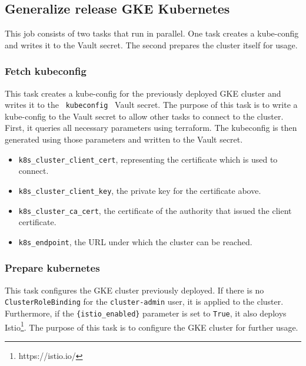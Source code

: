 \subsection{Generalize release GKE Kubernetes}\label{subsec:generalize-release-gke-kubernetes}

This job consists of two tasks that run in parallel.
One task creates a kube-config and writes it to the Vault secret.
The second prepares the cluster itself for usage.

\subsubsection{Fetch kubeconfig}\label{subsubsec:fetch-kubeconfig}

This task creates a kube-config for the previously deployed GKE cluster and writes it to the \verb| kubeconfig | Vault secret.
The purpose of this task is to write a kube-config to the Vault secret to allow other tasks to connect to the cluster.
First, it queries all necessary parameters using terraform.
The kubeconfig is then generated using those parameters and written to the Vault secret.

\begin{itemize}
    \item \verb|k8s_cluster_client_cert|, representing the certificate which is used to connect.
    \item \verb|k8s_cluster_client_key|, the private key for the certificate above.
    \item \verb|k8s_cluster_ca_cert|, the certificate of the authority that issued the client certificate.
    \item \verb|k8s_endpoint|, the URL under which the cluster can be reached.
\end{itemize}


\subsubsection{Prepare kubernetes}\label{subsubsec:prepare-kubernetes}

This task configures the GKE cluster previously deployed.
If there is no \verb|ClusterRoleBinding| for the \verb|cluster-admin| user, it is applied to the cluster.
Furthermore, if the \verb|{istio_enabled}| parameter is set to \verb|True|, it also deploys Istio\footnote{https://istio.io/}.
The purpose of this task is to configure the GKE cluster for further usage.
